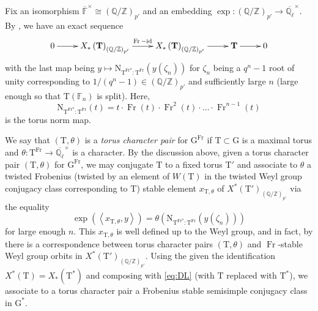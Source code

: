 \documentclass[12pt, reqno]{amsart}
\theoremstyle{definition}
\theoremstyle{definition}
\theoremstyle{definition}
\newcommand{\multiplicativegroup}[1]{#1^{\times}}
\newcommand{\idmap}{\mathrm{id}}
\newcommand{\innerproduct}[2]{\left\langle #1,#2\right\rangle}
\newcommand{\aFieldNorm}{\mathrm{N}}
\newcommand{\finiteField}{\mathbb{F}}
\newcommand{\finiteFieldExtension}[1]{\finiteField_{#1}}
\newcommand{\algebraicClosure}[1]{\overline{#1}}
\newcommand{\Frobenius}{\operatorname{Fr}}
\newcommand{\ladicnumbers}{\algebraicClosure{\mathbb{Q}_{\ell}}}
\newcommand{\algebraicGroup}[1]{\boldsymbol{\mathrm{#1}}}
\newcommand{\CharacterLattice}[1]{X^{\ast}\left(#1\right)}
\newcommand{\CocharacterLattice}[1]{X_{\ast}\left(#1\right)}
\begin{document}
Fix an isomorphism $\multiplicativegroup{\algebraicClosure{\finiteField}} \cong (\mathbb{Q}/\mathbb{Z})_{p'}$ and an embedding $\exp:(\mathbb{Q}/\mathbb{Z})_{p'} \to \overline{\mathbb{Q}_\ell}^\times$. 
By \cite[Proposition 13.7 (ii)]{DigneMichel2020}, we have an exact sequence
\begin{equation}
	\label{eq:DL}
	\xymatrix{0 \ar[r] & \CocharacterLattice{\algebraicGroup{T}}_{(\mathbb{Q}/\mathbb{Z})_{p'}} \ar[r]^{\Frobenius-\idmap} & \CocharacterLattice{\algebraicGroup{T}}_{(\mathbb{Q}/\mathbb{Z})_{p'}} \ar[r] & \algebraicGroup{T} \ar[r] & 0}
\end{equation}
with the last map being $y \mapsto \aFieldNorm_{\algebraicGroup{T}^{\Frobenius^n}:\algebraicGroup{T}^{\Frobenius}}(y(\zeta_n))$
for $\zeta_n$ being a $q^n-1$ root of unity corresponding to $1/(q^n-1) \in (\mathbb{Q}/\mathbb{Z})_{p'}$ and sufficiently large $n$ (large enough so that $\algebraicGroup{T}\left(\finiteFieldExtension{n}\right)$ is split). Here, $$\aFieldNorm_{\algebraicGroup{T}^{\Frobenius^n}:\algebraicGroup{T}^{\Frobenius}}(t) = t\cdot \Frobenius(t)\cdot \Frobenius^2(t)\cdot  \hdots \cdot \Frobenius^{n-1}(t)$$ is the torus norm map.

We say that $(\algebraicGroup{T},\theta)$ is a \emph{torus character pair} for $\algebraicGroup{G}^{\Frobenius}$ if $\algebraicGroup{T} \subset \algebraicGroup{G}$ is a maximal torus and $\theta \colon \algebraicGroup{T}^{\Frobenius} \to \multiplicativegroup{\ladicnumbers}$ is a character. By the discussion above, given a torus character pair  $(\algebraicGroup{T},\theta)$ for $\algebraicGroup{G}^{\Frobenius}$, we may conjugate $\algebraicGroup{T}$ to a fixed torus $\algebraicGroup{T}'$ and associate to $\theta$ a twisted Frobenius (twisted by an element of $W\left(\algebraicGroup{T}\right)$ in the twisted Weyl group conjugacy class corresponding to $\algebraicGroup{T}$) stable element $x_{\algebraicGroup{T},\theta}$ of $\CharacterLattice{\algebraicGroup{T}'}_{(\mathbb{Q}/\mathbb{Z})_{p'}}$ via the equality
\[
\exp(\innerproduct{x_{\algebraicGroup{T},\theta}}{y}) = \theta(\aFieldNorm_{\algebraicGroup{T}^{\Frobenius^n}:\algebraicGroup{T}^{\Frobenius}}(y(\zeta_n)))
\]
for large enough $n$. This $x_{\algebraicGroup{T},\theta}$ is well defined up to the Weyl group, and in fact, by \cite[Corollary 13.9]{DigneMichel2020} there is a correspondence between torus character pairs $(\algebraicGroup{T},\theta)$ and $\Frobenius$-stable Weyl group orbits in $\CharacterLattice{\algebraicGroup{T}'}_{(\mathbb{Q}/\mathbb{Z})_{p'}}$.  Using the given the identification $\CharacterLattice{\algebraicGroup{T}} = \CocharacterLattice{\algebraicGroup{T}^{\ast}}$ and composing with \eqref{eq:DL} (with $\algebraicGroup{T}$ replaced with $\algebraicGroup{T}^{\ast}$), we associate to a torus character pair a Frobenius stable semisimple conjugacy class in $\algebraicGroup{G}^*$.
\end{document}
